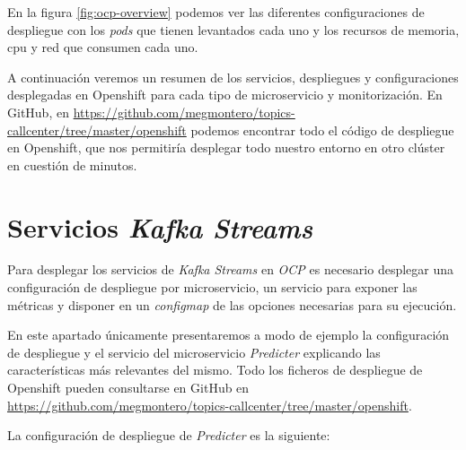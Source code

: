 En la figura \ref{fig:ocp-overview} podemos ver las diferentes configuraciones de despliegue con los \textit{pods} que tienen levantados cada uno y los recursos de memoria, cpu y red que consumen cada uno. 
 
A continuación veremos un resumen de los servicios, despliegues y configuraciones desplegadas en Openshift para cada tipo de microservicio y monitorización. En GitHub, en \href{https://github.com/megmontero/topics-callcenter/tree/master/openshift}{https://github.com/megmontero/topics-callcenter/tree/master/openshift} podemos encontrar todo el código de despliegue en Openshift, que nos permitiría desplegar todo nuestro entorno en otro clúster en cuestión de minutos. 


\section{Servicios \textit{Kafka Streams}}

Para desplegar los servicios de \textit{Kafka Streams} en \textit{OCP} es necesario desplegar una  configuración de despliegue por microservicio, un servicio para exponer las métricas y disponer en un \textit{configmap} de las opciones necesarias para su ejecución. 

En este apartado únicamente presentaremos a modo de ejemplo la configuración de despliegue y el servicio  del microservicio \textit{Predicter} explicando las características más relevantes del mismo. Todo los ficheros de despliegue de Openshift pueden consultarse en GitHub en \href{https://github.com/megmontero/topics-callcenter/tree/master/openshift}{https://github.com/megmontero/topics-callcenter/tree/master/openshift}.


La configuración de despliegue de \textit{Predicter} es la siguiente: 

